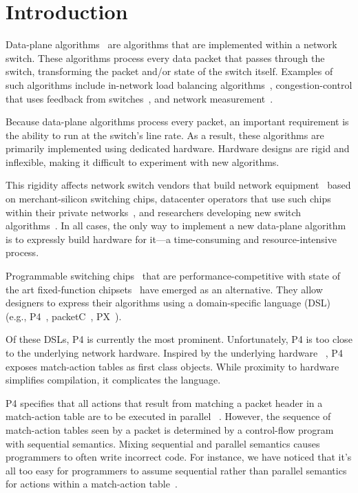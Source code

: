 \section{Introduction}
\label{s:intro}

Data-plane algorithms~\cite{cestan} are algorithms that are implemented within
a network switch. These algorithms process every data packet that passes
through the switch, transforming the packet and/or state of the switch itself.
Examples of such algorithms include in-network load balancing
algorithms~\cite{conga, ecmp}, congestion-control that uses feedback from
switches~\cite{xcp, rcp, pdq, dctcp}, and network measurement~\cite{opensketch,
bitmap_george, elephant_george}.

Because data-plane algorithms process every packet, an important requirement is
the ability to run at the switch's line rate.  As a result, these algorithms
are primarily implemented using dedicated hardware. Hardware designs are rigid
and inflexible, making it difficult to experiment with new algorithms.

This rigidity affects network switch vendors that build network
equipment~\cite{cisco_nexus, dell_force10, arista_7050} based on
merchant-silicon switching chips,  datacenter operators that use such chips
within their private networks~\cite{jupiter}, and researchers developing new
switch algorithms~\cite{xcp, codel, d3, detail, pdq}. In all cases, the only
way to implement a new data-plane algorithm is to expressly build hardware for
it---a time-consuming and resource-intensive process.

Programmable switching chips~\cite{flexpipe, xpliant, rmt} that are
performance-competitive with state of the art fixed-function
chipsets~\cite{trident, tomahawk, mellanox} have emerged as an alternative.
They allow designers to express their algorithms using a domain-specific
language (DSL) (e.g., P4~\cite{p4}, packetC~\cite{packetc}, PX~\cite{px}).

Of these DSLs, P4 is currently the most prominent. Unfortunately, P4 is too
close to the underlying network hardware. Inspired by the underlying hardware
~\cite{flexpipe, rmt}, P4 exposes match-action tables as first class objects.
While proximity to hardware simplifies compilation, it complicates the
language.

P4 specifies that all actions that result from matching a packet header in a
match-action table are to be executed in parallel ~\cite{p4spec}. However, the
sequence of match-action tables seen by a packet is determined by a
control-flow program with sequential semantics. Mixing sequential and parallel
semantics causes programmers to often write incorrect code. For instance, we
have noticed that it's all too easy for programmers to assume sequential rather
than parallel semantics for actions within a match-action
table~\cite{p4semantics}.

